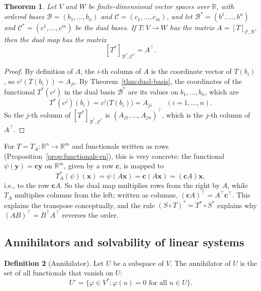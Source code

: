 \documentclass[11pt]{article}
\theoremstyle{definition}
\newtheorem{definition}{Definition}[section]
\theoremstyle{plain}
\newtheorem{theorem}[definition]{Theorem}
\theoremstyle{remark}
\begin{document}
\begin{theorem}\label{thm:dual-map-matrix}
    Let $V$ and $W$ be finite-dimensional vector spaces over $\mathbb{R}$, with ordered bases $\mathcal{B} = (b_1, \ldots, b_n)$ and $\mathcal{C} = (c_1, \ldots, c_m)$, and let $\mathcal{B}^* = (b^1, \ldots, b^n)$ and $\mathcal{C}^* = (c^1, \ldots, c^m)$ be the dual bases. If $T: V \to W$ has the matrix $A = [T]_{\mathcal{C}, \mathcal{B}}$, then the dual map has the matrix
    \[[T^*]_{\mathcal{B}^*, \mathcal{C}^*} = A^\top.\]
\end{theorem}

\begin{proof}
    By definition of $A$, the $i$-th column of $A$ is the coordinate vector of $T(b_i)$, so $c^j(T(b_i)) = A_{ji}$. By Theorem~\ref{thm:dual-basis}, the coordinates of the functional $T^*(c^j)$ in the dual basis $\mathcal{B}^*$ are its values on $b_1, \ldots, b_n$, which are
    \[T^*(c^j)(b_i) = c^j\big(T(b_i)\big) = A_{ji} \qquad (i = 1, \ldots, n).\]
    So the $j$-th column of $[T^*]_{\mathcal{B}^*, \mathcal{C}^*}$ is $(A_{j1}, \ldots, A_{jn})^\top$, which is the $j$-th column of $A^\top$.
\end{proof}

For $T = T_A: \mathbb{R}^n \to \mathbb{R}^m$ and functionals written as rows (Proposition~\ref{prop:functionals-rn}), this is very concrete: the functional $\psi(\mathbf{y}) = \mathbf{c}\mathbf{y}$ on $\mathbb{R}^m$, given by a row $\mathbf{c}$, is mapped to
\[T_A^*(\psi)(\mathbf{x}) = \psi(A\mathbf{x}) = \mathbf{c}(A\mathbf{x}) = (\mathbf{c}A)\mathbf{x},\]
i.e., to the row $\mathbf{c}A$. So the dual map multiplies rows from the right by $A$, while $T_A$ multiplies columns from the left; written as columns, $(\mathbf{c}A)^\top = A^\top \mathbf{c}^\top$. This explains the transpose conceptually, and the rule $(S \circ T)^* = T^* \circ S^*$ explains why $(AB)^\top = B^\top A^\top$ reverses the order.

\subsection{Annihilators and solvability of linear systems}

\begin{definition}[Annihilator]
    Let $U$ be a subspace of $V$. The annihilator of $U$ is the set of all functionals that vanish on $U$:
    \[U^\circ = \{\varphi \in V^* : \varphi(u) = 0 \text{ for all } u \in U\}.\]
\end{definition}
\end{document}
